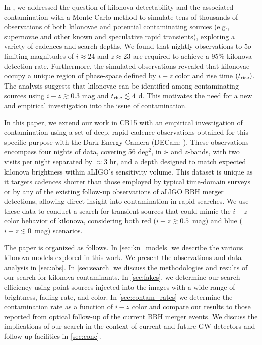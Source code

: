 In \citet[hereafter CB15]{cowp15}, we addressed the question of kilonova detectability and the associated contamination with a Monte Carlo method to simulate tens of thousands of observations of both kilonovae and potential contaminating sources (e.g., supernovae and other known and speculative rapid transients), exploring a variety of cadences and search depths. We found that nightly observations to $5\sigma$ limiting magnitudes of $i \approx 24$ and $z \approx 23$ are required to achieve a 95\% kilonova detection rate. Furthermore, the simulated observations revealed that kilonovae occupy a unique region of phase-space defined by $i-z$ color and rise time $(t_{\rm rise})$. The analysis suggests that kilonovae can be identified among contaminating sources using $i-z\gtrsim 0.3$ mag and $t_{\rm rise}\lesssim 4$ d. This motivates the need for a new and empirical investigation into the issue of contamination.

In this paper, we extend our work in CB15 with an empirical investigation of contamination using a set of deep, rapid-cadence observations obtained for this specific purpose with the Dark Energy Camera (DECam; \citealt{flaugher+15}). These observations encompass four nights of data, covering 56 deg$^2$, in $i$- and $z$-bands, with two visits per night separated by $\approx 3$ hr, and a depth designed to match expected kilonova brightness within aLIGO's sensitivity volume. This dataset is unique as it targets cadences shorter than those employed by typical time-domain surveys or by any of the existing follow-up observations of aLIGO BBH merger detections, allowing direct insight into contamination in rapid searches. We use these data to conduct a search for transient sources that could mimic the $i-z$ color behavior of kilonova, considering both red ($i-z \gtrsim 0.5$~mag) and blue ($i-z \lesssim 0$~mag) scenarios.

The paper is organized as follows. In \autoref{sec:kn_models} we describe the various kilonova models explored in this work. We present the observations and data analysis in \autoref{sec:obs}. In \autoref{sec:search} we discuss the methodologies and results of our search for kilonova contaminants. In \autoref{sec:fakes}, we determine our search efficiency using point sources injected into the images with a wide range of brightness, fading rate, and color. In \autoref{sec:contam_rates} we determine the contamination rate as a function of $i-z$ color and compare our results to those reported from optical follow-up of the current BBH merger events. We discuss the implications of our search in the context of current and future GW detectors and follow-up facilities in \autoref{sec:conc}.

